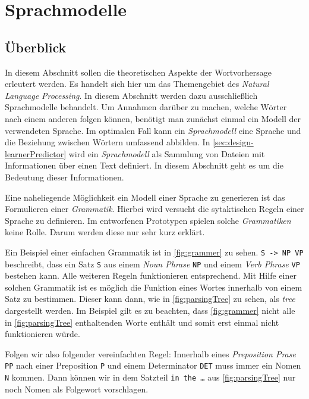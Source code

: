 \section{Sprachmodelle}

    \subsection{Überblick}
    	In diesem Abschnitt sollen die theoretischen Aspekte der Wortvorhersage erleutert werden. Es handelt sich hier um das Themengebiet des \emph{Natural Language Processing}. In diesem Abschnitt werden dazu ausschließlich Sprachmodelle behandelt. Um Annahmen darüber zu machen, welche Wörter nach einem anderen folgen können, benötigt man zunächst einmal ein Modell der verwendeten Sprache. Im optimalen Fall kann ein \emph{Sprachmodell} eine Sprache und die Beziehung zwischen Wörtern umfassend abbilden. In \autoref{sec:design-learnerPredictor} wird ein \emph{Sprachmodell} als Sammlung von Dateien mit Informationen über einen Text definiert. In diesem Abschnitt geht es um die Bedeutung dieser Informationen.
        
        Eine naheliegende Möglichkeit ein Modell einer Sprache zu generieren ist das Formulieren einer \emph{Grammatik}. Hierbei wird versucht die sytaktischen Regeln einer Sprache zu definieren. Im entworfenen Prototypen spielen solche \emph{Grammatiken} keine Rolle. Darum werden diese nur sehr kurz erklärt.
        
        Ein Beispiel einer einfachen Grammatik ist in \autoref{fig:grammer} zu sehen. \texttt{S -> NP VP} beschreibt, dass ein Satz \texttt{S} aus einem \emph{Noun Phrase} \texttt{NP} und einem \emph{Verb Phrase} \texttt{VP} bestehen kann. Alle weiteren Regeln funktionieren entsprechend. Mit Hilfe einer solchen Grammatik ist es möglich die Funktion eines Wortes innerhalb von einem Satz zu bestimmen. Dieser kann dann, wie in \autoref{fig:parsingTree} zu sehen,  als \emph{tree} dargestellt werden. Im Beispiel gilt es zu beachten, dass \autoref{fig:grammer} nicht alle in \autoref{fig:parsingTree} enthaltenden Worte enthält und somit erst einmal nicht funktionieren würde.
        
        Folgen wir also folgender vereinfachten Regel: Innerhalb eines \emph{Preposition Prase} \texttt{PP} nach einer Preposition \texttt{P} und einem Determinator \texttt{DET} muss immer ein Nomen \texttt{N} kommen. Dann können wir in dem Satzteil \texttt{in the …} aus \autoref{fig:parsingTree} nur noch Nomen als Folgewort vorschlagen.
        
